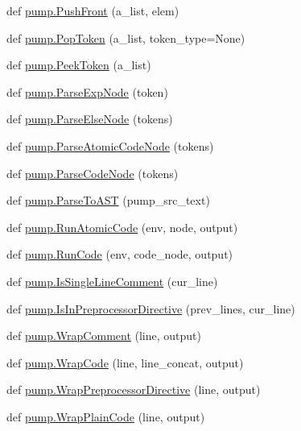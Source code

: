 \begin{DoxyCompactItemize}
\item 
def \mbox{\hyperlink{namespacepump_a12c70577eb727526ac0ad17bf3b6c3a4}{pump.\+Push\+Front}} (a\+\_\+list, elem)
\item 
def \mbox{\hyperlink{namespacepump_a45e1d5d5c1c188fc53eee8bd1e00e6b0}{pump.\+Pop\+Token}} (a\+\_\+list, token\+\_\+type=None)
\item 
def \mbox{\hyperlink{namespacepump_ab12085e099ab4bd0cd968efdc435ec31}{pump.\+Peek\+Token}} (a\+\_\+list)
\item 
def \mbox{\hyperlink{namespacepump_af62b08489d90e69d0577e82c98383ba7}{pump.\+Parse\+Exp\+Node}} (token)
\item 
def \mbox{\hyperlink{namespacepump_ae40493525a993e81929c6905e329a406}{pump.\+Parse\+Else\+Node}} (tokens)
\item 
def \mbox{\hyperlink{namespacepump_a5532710f334f026f80fc485decf5078e}{pump.\+Parse\+Atomic\+Code\+Node}} (tokens)
\item 
def \mbox{\hyperlink{namespacepump_aabbc064b8664abbe05618b3a0f5a6c38}{pump.\+Parse\+Code\+Node}} (tokens)
\item 
def \mbox{\hyperlink{namespacepump_a56ac10a83a3a875d305c9aae71fc0549}{pump.\+Parse\+To\+A\+ST}} (pump\+\_\+src\+\_\+text)
\item 
def \mbox{\hyperlink{namespacepump_a901e6abd34691a0d779178a615cc09c1}{pump.\+Run\+Atomic\+Code}} (env, node, output)
\item 
def \mbox{\hyperlink{namespacepump_ac6a714a44e28c2a19a1dfabeb9c9d4f1}{pump.\+Run\+Code}} (env, code\+\_\+node, output)
\item 
def \mbox{\hyperlink{namespacepump_a417078b1d036b67756c47e5dc50324dc}{pump.\+Is\+Single\+Line\+Comment}} (cur\+\_\+line)
\item 
def \mbox{\hyperlink{namespacepump_aa33101b01d5781710262f3b5dadd8bc8}{pump.\+Is\+In\+Preprocessor\+Directive}} (prev\+\_\+lines, cur\+\_\+line)
\item 
def \mbox{\hyperlink{namespacepump_a73951c98652038351b1cd24291433e12}{pump.\+Wrap\+Comment}} (line, output)
\item 
def \mbox{\hyperlink{namespacepump_a42502545a37fcd4513a0a7ac8ef3c0eb}{pump.\+Wrap\+Code}} (line, line\+\_\+concat, output)
\item 
def \mbox{\hyperlink{namespacepump_a59e8ae06bae068d2d72df4f0340635d8}{pump.\+Wrap\+Preprocessor\+Directive}} (line, output)
\item 
def \mbox{\hyperlink{namespacepump_a60723738cc38d8ced7e2cfecc72d8b11}{pump.\+Wrap\+Plain\+Code}} (line, output)

\end{DoxyCompactItemize}
